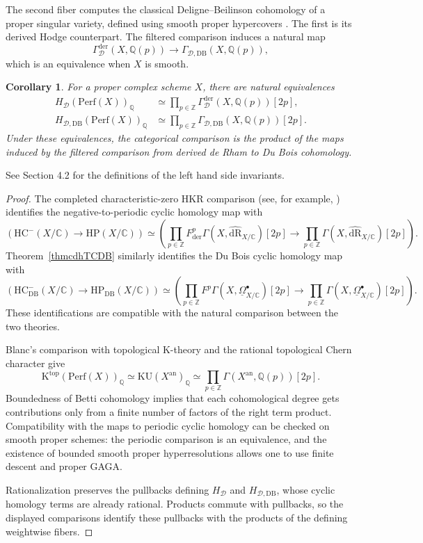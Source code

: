 \documentclass{amsart}
\theoremstyle{plain}
\newtheorem{corollary}[prop]{Corollary}
\theoremstyle{definition}
\newcommand{\bbC}{\mathbb{C}}
\newcommand{\bbQ}{\mathbb{Q}}
\newcommand{\bbZ}{\mathbb{Z}}
\newcommand{\Perf}{\mathrm{Perf}}
\newcommand{\HC}{\mathrm{HC}}
\newcommand{\HP}{\mathrm{HP}}
\newcommand{\K}{\mathrm{K}}
\newcommand{\KU}{\mathrm{KU}}
\newcommand{\DB}{\mathrm{DB}}
\newcommand{\der}{\mathrm{der}}
\newcommand{\an}{\mathrm{an}}
\newcommand{\dR}{\mathrm{dR}}
\begin{document}
The second fiber computes the classical Deligne--Beilinson cohomology of a proper singular variety, defined using smooth proper hypercovers
\cite[\S5, especially Definition 5.3]{EV88}.
The first is its derived Hodge counterpart. The filtered comparison induces a natural map
\[
\Gamma_{\mathcal D}^{\der}(X,\bbQ(p))
\longrightarrow
\Gamma_{\mathcal D, \DB}(X,\bbQ(p)),
\]
which is an equivalence when $X$ is smooth.

\begin{corollary}\label{DeligneDBrational}
For a proper complex scheme $X$, there are natural equivalences
\[
\begin{aligned}
H_{\mathcal D}(\Perf(X))_{\bbQ}
&\simeq
\prod_{p\in\bbZ}
\Gamma_{\mathcal D}^{\der}(X,\bbQ(p))[2p],\\
H_{\mathcal D,\DB}(\Perf(X))_{\bbQ}
&\simeq
\prod_{p\in\bbZ}
\Gamma_{\mathcal D, \DB}(X,\bbQ(p))[2p].
\end{aligned}
\]
Under these equivalences, the categorical comparison is the product of the maps induced by the filtered comparison from derived de Rham to Du Bois cohomology.
\end{corollary}

See Section 4.2 for the definitions of the left hand side invariants.

\begin{proof}
The completed characteristic-zero HKR comparison (see, for example,
\cite[Theorem 1.1]{Ant19}) identifies the negative-to-periodic cyclic homology map with
\[
(
\HC^-(X/\bbC)\longrightarrow \HP(X/\bbC)
)
\simeq
(\prod_{p\in\bbZ}
F_{\der}^p
\Gamma(X,\widehat{\dR}_{X/\bbC})[2p]
\longrightarrow
\prod_{p\in\bbZ}
\Gamma(X,\widehat{\dR}_{X/\bbC})[2p]).
\]
Theorem~\ref{thmcdhTCDB} similarly identifies the Du Bois cyclic homology map with
\[
(\HC^-_{\DB}(X/\bbC)\longrightarrow \HP_{\DB}(X/\bbC))
\simeq
(\prod_{p\in\bbZ}
F^p\Gamma(X,\underline\Omega^\bullet_{X/\bbC})[2p]
\longrightarrow
\prod_{p\in\bbZ}
\Gamma(X,\underline\Omega^\bullet_{X/\bbC})[2p]).
\]
These identifications are compatible with the natural comparison between the two theories.

Blanc's comparison with topological $\K$-theory
\cite[Proposition 4.32]{Bla16} and the rational topological Chern character give
\[
\K^{\mathrm{top}}(\Perf(X))_{\bbQ}
\simeq \KU(X^{\an})_{\bbQ}
\simeq
\prod_{p\in\bbZ}\Gamma(X^{\an},\bbQ(p))[2p].
\]
Boundedness of Betti cohomology implies that each cohomological degree gets contributions only from a finite number of factors of the right term product.
Compatibility with the maps to periodic cyclic homology can be checked on smooth proper schemes: the periodic comparison is an equivalence, and the existence of bounded smooth proper hyperresolutions allows one to use finite descent and proper GAGA.

Rationalization preserves the pullbacks defining
$H_{\mathcal D}$ and $H_{\mathcal D,\DB}$, whose cyclic homology terms are already rational. Products commute with pullbacks, so the displayed comparisons identify these pullbacks with the products of the defining weightwise fibers.
\end{proof}
\end{document}
